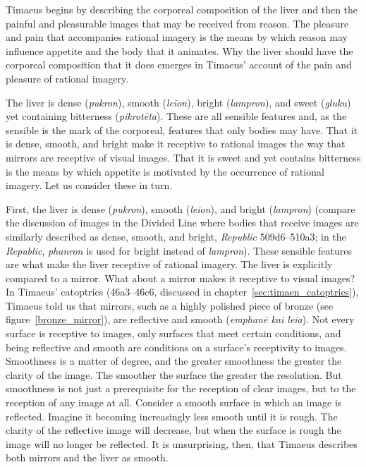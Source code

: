 Timaeus begins by describing the corporeal composition of the liver and then the painful and pleasurable images that may be received from reason. The pleasure and pain that accompanies rational imagery is the means by which reason may influence appetite and the body that it animates. Why the liver should have the corporeal composition that it does emerges in Timaeus' account of the pain and pleasure of rational imagery.

The liver is dense (\emph{pukron}), smooth (\emph{leīon}), bright (\emph{lampron}), and sweet (\emph{gluku}) yet containing bitterness (\emph{pikrotēta}). These are all sensible features and, as the sensible is the mark of the corporeal, features that only bodies may have. That it is dense, smooth, and bright make it receptive to rational images the way that mirrors are receptive of visual images. That it is sweet and yet contains bitterness is the means by which appetite is motivated by the occurrence of rational imagery. Let us consider these in turn.

First, the liver is dense (\emph{pukron}), smooth (\emph{leīon}), and bright (\emph{lampron}) (compare the discussion of images in the Divided Line where bodies that receive images are similarly described as dense, smooth, and bright, \emph{Republic} 509d6--510a3; in the \emph{Republic}, \emph{phanron} is used for bright instead of \emph{lampron}). These sensible features are what make the liver receptive of rational imagery. The liver is explicitly compared to a mirror. What about a mirror makes it receptive to visual images? In Timaeus' catoptrics (46a3–46c6, discussed in chapter~\ref{sec:timaen_catoptrics}), Timaeus told us that mirrors, such as a highly polished piece of bronze (see figure~\ref{bronze_mirror}), are reflective and smooth (\emph{emphanē kai leia}). Not every surface is receptive to images, only surfaces that meet certain conditions, and being reflective and smooth are conditions on a surface's receptivity to images. Smoothness is a matter of degree, and the greater smoothness the greater the clarity of the image. The smoother the surface the greater the resolution. But smoothness is not just a prerequisite for the reception of clear images, but to the reception of any image at all. Consider a smooth surface in which an image is reflected. Imagine it becoming increasingly less smooth until it is rough. The clarity of the reflective image will decrease, but when the surface is rough the image will no longer be reflected. It is unsurprising, then, that Timaeus describes both mirrors and the liver as smooth. 

